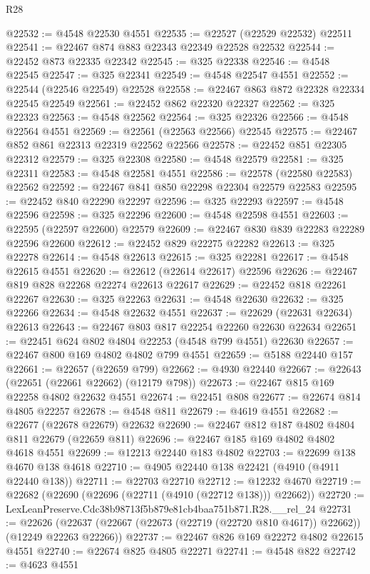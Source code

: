 \begin{lexlean}{R28}
\begin{coremodule}
@22532 := @4548 @22530 @4551
@22535 := @22527 (@22529 @22532) @22511
@22541 := @22467 @874 @883 @22343 @22349 @22528 @22532
@22544 := @22452 @873 @22335 @22342
@22545 := @325 @22338
@22546 := @4548 @22545
@22547 := @325 @22341
@22549 := @4548 @22547 @4551
@22552 := @22544 (@22546 @22549) @22528
@22558 := @22467 @863 @872 @22328 @22334 @22545 @22549
@22561 := @22452 @862 @22320 @22327
@22562 := @325 @22323
@22563 := @4548 @22562
@22564 := @325 @22326
@22566 := @4548 @22564 @4551
@22569 := @22561 (@22563 @22566) @22545
@22575 := @22467 @852 @861 @22313 @22319 @22562 @22566
@22578 := @22452 @851 @22305 @22312
@22579 := @325 @22308
@22580 := @4548 @22579
@22581 := @325 @22311
@22583 := @4548 @22581 @4551
@22586 := @22578 (@22580 @22583) @22562
@22592 := @22467 @841 @850 @22298 @22304 @22579 @22583
@22595 := @22452 @840 @22290 @22297
@22596 := @325 @22293
@22597 := @4548 @22596
@22598 := @325 @22296
@22600 := @4548 @22598 @4551
@22603 := @22595 (@22597 @22600) @22579
@22609 := @22467 @830 @839 @22283 @22289 @22596 @22600
@22612 := @22452 @829 @22275 @22282
@22613 := @325 @22278
@22614 := @4548 @22613
@22615 := @325 @22281
@22617 := @4548 @22615 @4551
@22620 := @22612 (@22614 @22617) @22596
@22626 := @22467 @819 @828 @22268 @22274 @22613 @22617
@22629 := @22452 @818 @22261 @22267
@22630 := @325 @22263
@22631 := @4548 @22630
@22632 := @325 @22266
@22634 := @4548 @22632 @4551
@22637 := @22629 (@22631 @22634) @22613
@22643 := @22467 @803 @817 @22254 @22260 @22630 @22634
@22651 := @22451 @624 @802 @4804 @22253 (@4548 @799 @4551) @22630
@22657 := @22467 @800 @169 @4802 @4802 @799 @4551
@22659 := @5188 @22440 @157
@22661 := @22657 (@22659 @799)
@22662 := @4930 @22440
@22667 := @22643 (@22651 (@22661 @22662) (@12179 @798))
@22673 := @22467 @815 @169 @22258 @4802 @22632 @4551
@22674 := @22451 @808
@22677 := @22674 @814 @4805 @22257
@22678 := @4548 @811
@22679 := @4619 @4551
@22682 := @22677 (@22678 @22679) @22632
@22690 := @22467 @812 @187 @4802 @4804 @811 @22679 (@22659 @811)
@22696 := @22467 @185 @169 @4802 @4802 @4618 @4551
@22699 := @12213 @22440 @183 @4802
@22703 := @22699 @138 @4670 @138 @4618
@22710 := @4905 @22440 @138 @22421 (@4910 (@4911 @22440 @138))
@22711 := @22703 @22710
@22712 := @12232 @4670
@22719 := @22682 (@22690 (@22696 (@22711 (@4910 (@22712 @138))) @22662))
@22720 := LexLeanPreserve.Cdc38b98713f5b879e81cb4baa751b871.R28.__rel_24
@22731 := @22626
    (@22637 (@22667 (@22673 (@22719 (@22720 @810 @4617)) @22662)) (@12249 @22263 @22266))
@22737 := @22467 @826 @169 @22272 @4802 @22615 @4551
@22740 := @22674 @825 @4805 @22271
@22741 := @4548 @822
@22742 := @4623 @4551

\end{coremodule}
\end{lexlean}
